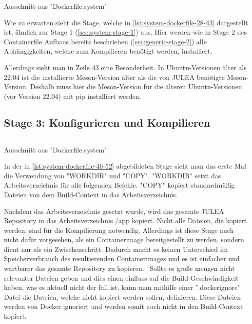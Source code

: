 \begin{listing}[H]
    \inputminted[firstline=28,lastline=43]{dockerfile}{./code-examples/Dockerfile.system}
    \caption{Ausschnitt aus "Dockerfile.system"}
    \label{lst:system-dockerfile-28-43}
\end{listing}

Wie zu erwarten sieht die Stage, welche in \cref{lst:system-dockerfile-28-43} dargestellt ist, ähnlich zur Stage 1 (\cref{sec:system-stage-1}) aus. Hier werden wie in Stage 2 des Containerfile Aufbaus bereits beschrieben (\cref{sec:generic-stage-2}) alle Abhängigkeiten, welche zum Kompilieren benötigt werden, installiert. 

Allerdings sieht man in Zeile 43 eine Besonderheit. In Ubuntu-Versionen älter als 22.04 ist die installierte Meson-Version älter als die von JULEA benötigte Meson-Version. Deshalb muss hier die Meson-Version für die älteren Ubuntu-Versionen (vor Version 22.04) mit pip \cite{pythonInstallingPackagesPython} installiert werden. 

\subsection{Stage 3: Konfigurieren und Kompilieren} \label{sec:system-stage-3}

\begin{listing}[H]
    \inputminted[firstline=46,lastline=52]{dockerfile}{./code-examples/Dockerfile.system}
    \caption{Ausschnitt aus "Dockerfile.system"}
    \label{lst:system-dockerfile-46-52}
\end{listing}

In der in \cref{lst:system-dockerfile-46-52} abgebildeten Stage sieht man das erste Mal die Verwendung von "WORKDIR" und "COPY". "WORKDIR" setzt das Arbeitsverzeichnis für alle folgenden Befehle. "COPY" kopiert standardmäßig Dateien von dem Build-Context in das Arbeitsverzeichnis.

Nachdem das Arbeitsverzeichnis gesetzt wurde, wird das gesamte JULEA Repository in das Arbeitsverzeichnis /app kopiert. Nicht alle Dateien, die kopiert werden, sind für die Kompilierung notwendig. Allerdings ist diese Stage auch nicht dafür vorgesehen, als ein Containerimage bereitgestellt zu werden, sondern dient nur als ein Zwischenschritt. Dadurch macht es keinen Unterschied im Speicherverbrauch des resultierenden Containerimages und es ist einfacher und wartbarer das gesamte Repository zu kopieren. \
Sollte es große mengen nicht relevanter Dateien geben und dies einen einfluss auf die Build-Geschwindigkeit haben, was es aktuell nicht der fall ist, kann man mithilfe einer ".dockerignore" Datei die Dateien, welche nicht kopiert werden sollen, definieren. Diese Dateien werden von Docker ignoriert und werden somit auch nicht in den Build-Context kopiert. 

